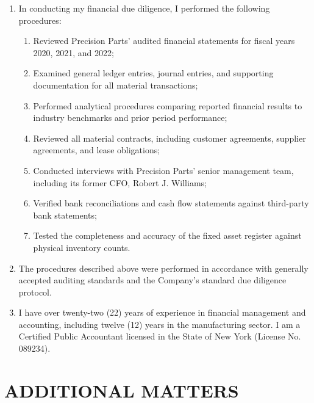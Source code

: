 \documentclass[
    language=english,
    doctype=affidavit,
    institution=none,
]{../../omnilatex}
\begin{document}
\begin{enumerate}[resume]
    \item In conducting my financial due diligence, I performed the following procedures:
    \begin{enumerate}[label=(\alph*)]
        \item Reviewed Precision Parts' audited financial statements for fiscal years 2020, 2021, and 2022;
        \item Examined general ledger entries, journal entries, and supporting documentation for all material transactions;
        \item Performed analytical procedures comparing reported financial results to industry benchmarks and prior period performance;
        \item Reviewed all material contracts, including customer agreements, supplier agreements, and lease obligations;
        \item Conducted interviews with Precision Parts' senior management team, including its former CFO, Robert J. Williams;
        \item Verified bank reconciliations and cash flow statements against third-party bank statements;
        \item Tested the completeness and accuracy of the fixed asset register against physical inventory counts.
    \end{enumerate}

    \item The procedures described above were performed in accordance with generally accepted auditing standards and the Company's standard due diligence protocol.

    \item I have over twenty-two (22) years of experience in financial management and accounting, including twelve (12) years in the manufacturing sector. I am a Certified Public Accountant licensed in the State of New York (License No. 089234).
\end{enumerate}

\section{ADDITIONAL MATTERS}
\end{document}
